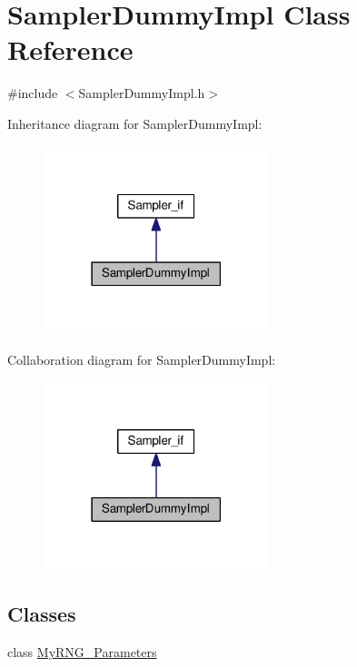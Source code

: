 \hypertarget{class_sampler_dummy_impl}{}\section{Sampler\+Dummy\+Impl Class Reference}
\label{class_sampler_dummy_impl}


{\ttfamily \#include $<$Sampler\+Dummy\+Impl.\+h$>$}



Inheritance diagram for Sampler\+Dummy\+Impl\+:\nopagebreak
\begin{figure}[H]
\begin{center}
\leavevmode
\includegraphics[width=186pt]{class_sampler_dummy_impl__inherit__graph}
\end{center}
\end{figure}


Collaboration diagram for Sampler\+Dummy\+Impl\+:\nopagebreak
\begin{figure}[H]
\begin{center}
\leavevmode
\includegraphics[width=186pt]{class_sampler_dummy_impl__coll__graph}
\end{center}
\end{figure}
\subsection*{Classes}
\begin{DoxyCompactItemize}
\item 
class \hyperlink{class_sampler_dummy_impl_1_1_my_r_n_g___parameters}{My\+R\+N\+G\+\_\+\+Parameters}
\end{DoxyCompactItemize}
